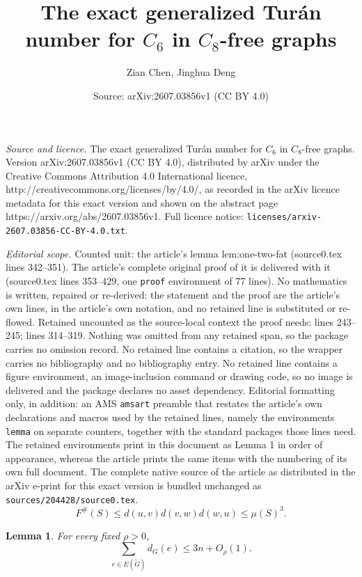 \documentclass[10pt,a4paper]{amsart}
\title{The exact generalized Tur\'an number for \(C_6\) in \(C_8\)-free graphs}
\author{Zian Chen, Jinghua Deng}
\date{Source: arXiv:2607.03856v1 (CC BY 4.0)}
\newtheorem{lemma}{Lemma}
\begin{document}
\maketitle

\noindent\emph{Source and licence.} The exact generalized Tur\'an number for \(C_6\) in \(C_8\)-free graphs. Version arXiv:2607.03856v1 (CC BY 4.0), distributed by arXiv under the Creative Commons Attribution 4.0 International licence, http://creativecommons.org/licenses/by/4.0/, as recorded in the arXiv licence metadata for this exact version and shown on the abstract page https://arxiv.org/abs/2607.03856v1. Full licence notice: \texttt{licenses/arxiv-2607.03856-CC-BY-4.0.txt}.\par\smallskip

\noindent\textit{Editorial scope.} Counted unit: the article's lemma lem:one-two-fat (source0.tex lines 342--351). The article's complete original proof of it is delivered with it (source0.tex lines 353--429, one \texttt{proof} environment of 77 lines). No mathematics is written, repaired or re-derived: the statement and the proof are the article's own lines, in the article's own notation, and no retained line is substituted or re-flowed.  Retained uncounted as the source-local context the proof needs: lines 243--245; lines 314--319.  Nothing was omitted from any retained span, so the package carries no omission record.  No retained line contains a citation, so the wrapper carries no bibliography and no bibliography entry.  No retained line contains a figure environment, an image-inclusion command or drawing code, so no image is delivered and the package declares no asset dependency.  Editorial formatting only, in addition: an AMS \texttt{amsart} preamble that restates the article's own declarations and macros used by the retained lines, namely the environments \texttt{lemma} on separate counters, together with the standard packages those lines need.  The retained environments print in this document as Lemma 1 in order of appearance, whereas the article prints the same items with the numbering of its own full document.  The complete native source of the article as distributed in the arXiv e-print for this exact version is bundled unchanged as \texttt{sources/204428/source0.tex}.
\begin{equation}\label{eq:charge}
  F^{\#}(S)\le d(u,v)d(v,w)d(w,u)\le\mu(S)^3.
\end{equation}

\begin{lemma}\label{lem:linear-budget}
For every fixed \(\rho>0\),
\[
  \sum_{e\in E(\tilde{G})}d_G(e)\le3n+O_\rho(1).
\]
\end{lemma}
\end{document}

